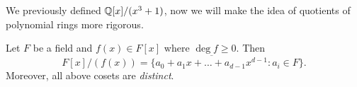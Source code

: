 We previously defined $\mathbb{Q}[x]/(x^3+1)$, now we will make the idea of quotients of polynomial rings more rigorous.

\begin{theorem}
    Let $F$ be a field and $f(x) \in F[x]$ where $\deg f \geq 0$. Then
    \[ F[x] / (f(x)) = \{ \overline{a_0 + a_1 x + \ldots + a_{d - 1}x^{d - 1}} : a_i \in F \}. \]
    Moreover, all above cosets are \emph{distinct}.
\end{theorem}
